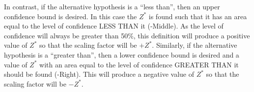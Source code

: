 \documentclass[10pt,openany]{book}\usepackage[]{graphicx}\usepackage[]{color}
\begin{document}
In contrast, if the alternative hypothesis is a ``less than'', then an upper confidence bound is desired.  In this case the $Z^{*}$ is found such that it has an area equal to the level of confidence LESS THAN it (-Middle).  As the level of confidence will always be greater than 50\%, this definition will produce a positive value of $Z^{*}$ so that the scaling factor will be $+Z^{*}$.  Similarly, if the alternative hypothesis is a ``greater than'', then a lower confidence bound is desired and a value of $Z^{*}$ with an area equal to the level of confidence GREATER THAN it should be found (-Right).  This will produce a negative value of $Z^{*}$ so that the scaling factor will be $-Z^{*}$.


\vspace{-12pt}
\end{document}
